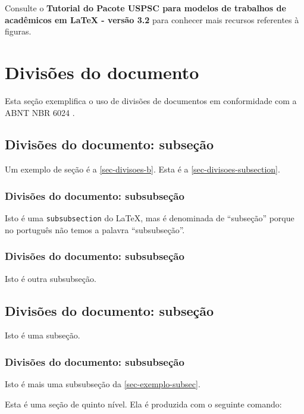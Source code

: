Consulte o \textbf{Tutorial do Pacote USPSC para modelos de trabalhos de acad\^emicos em LaTeX - vers\~ao 3.2} para conhecer mais recursos referentes à figuras. 

\section{Divisões do documento}\label{sec-divisoes-b}
Esta seção exemplifica o uso de divisões de documentos em conformidade com a ABNT NBR 6024  \cite{nbr6024}.
\subsection{Divisões do documento: subseção}\label{sec-divisoes-subsection}

Um exemplo de seção é a \autoref{sec-divisoes-b}. Esta é a \autoref{sec-divisoes-subsection}.

\subsubsection{Divisões do documento: subsubseção}\label{sec-divisoes-subsubsection}

Isto é uma \texttt{subsubsection} do \LaTeX, mas é denominada de ``subseção'' porque no português não temos a palavra ``subsubseção''.

\subsubsection{Divisões do documento: subsubseção}

Isto é outra subsubseção.

\subsection{Divisões do documento: subseção}\label{sec-exemplo-subsec}

Isto é uma subseção.

\subsubsection{Divisões do documento: subsubseção}

Isto é mais uma subsubseção da \autoref{sec-exemplo-subsec}.


\label{sec-exemplo-subsubsubsection}

Esta é uma seção de quinto nível. Ela é produzida com o seguinte comando:

